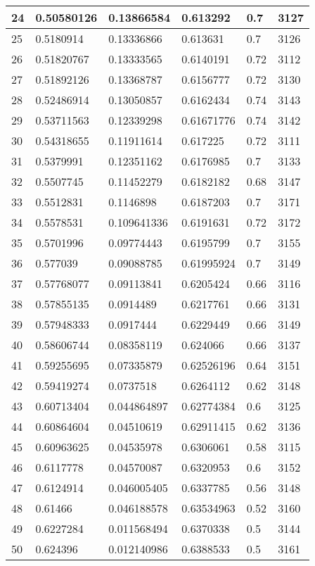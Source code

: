 \begin{longtable}{|l|l|l|l|l|l|}
24 & 0.50580126 & 0.13866584 & 0.613292 & 0.7 & 3127 \\ \hline 
25 & 0.5180914 & 0.13336866 & 0.613631 & 0.7 & 3126 \\ \hline 
26 & 0.51820767 & 0.13333565 & 0.6140191 & 0.72 & 3112 \\ \hline 
27 & 0.51892126 & 0.13368787 & 0.6156777 & 0.72 & 3130 \\ \hline 
28 & 0.52486914 & 0.13050857 & 0.6162434 & 0.74 & 3143 \\ \hline 
29 & 0.53711563 & 0.12339298 & 0.61671776 & 0.74 & 3142 \\ \hline 
30 & 0.54318655 & 0.11911614 & 0.617225 & 0.72 & 3111 \\ \hline 
31 & 0.5379991 & 0.12351162 & 0.6176985 & 0.7 & 3133 \\ \hline 
32 & 0.5507745 & 0.11452279 & 0.6182182 & 0.68 & 3147 \\ \hline 
33 & 0.5512831 & 0.1146898 & 0.6187203 & 0.7 & 3171 \\ \hline 
34 & 0.5578531 & 0.109641336 & 0.6191631 & 0.72 & 3172 \\ \hline 
35 & 0.5701996 & 0.09774443 & 0.6195799 & 0.7 & 3155 \\ \hline 
36 & 0.577039 & 0.09088785 & 0.61995924 & 0.7 & 3149 \\ \hline 
37 & 0.57768077 & 0.09113841 & 0.6205424 & 0.66 & 3116 \\ \hline 
38 & 0.57855135 & 0.0914489 & 0.6217761 & 0.66 & 3131 \\ \hline 
39 & 0.57948333 & 0.0917444 & 0.6229449 & 0.66 & 3149 \\ \hline 
40 & 0.58606744 & 0.08358119 & 0.624066 & 0.66 & 3137 \\ \hline 
41 & 0.59255695 & 0.07335879 & 0.62526196 & 0.64 & 3151 \\ \hline 
42 & 0.59419274 & 0.0737518 & 0.6264112 & 0.62 & 3148 \\ \hline 
43 & 0.60713404 & 0.044864897 & 0.62774384 & 0.6 & 3125 \\ \hline 
44 & 0.60864604 & 0.04510619 & 0.62911415 & 0.62 & 3136 \\ \hline 
45 & 0.60963625 & 0.04535978 & 0.6306061 & 0.58 & 3115 \\ \hline 
46 & 0.6117778 & 0.04570087 & 0.6320953 & 0.6 & 3152 \\ \hline 
47 & 0.6124914 & 0.046005405 & 0.6337785 & 0.56 & 3148 \\ \hline 
48 & 0.61466 & 0.046188578 & 0.63534963 & 0.52 & 3160 \\ \hline 
49 & 0.6227284 & 0.011568494 & 0.6370338 & 0.5 & 3144 \\ \hline 
50 & 0.624396 & 0.012140986 & 0.6388533 & 0.5 & 3161 \\ \hline 
\end{longtable}